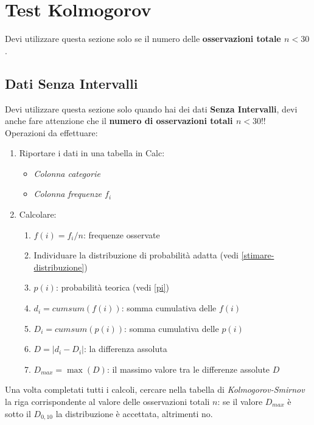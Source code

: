\section{Test Kolmogorov}

Devi utilizzare questa sezione solo se il numero delle \textbf{osservazioni
    totale $n < 30$}.

\subsection{Dati Senza Intervalli}

Devi utilizzare questa sezione solo quando hai dei dati \textbf{Senza
    Intervalli}, devi anche fare attenzione che il \textbf{numero di
    osservazioni totali $n < 30$}!!\\

Operazioni da effettuare:

\begin{enumerate}
    \item Riportare i dati in una tabella in Calc:
          \begin{itemize}
              \item \textit{Colonna categorie}
              \item \textit{Colonna frequenze $f_i$}
          \end{itemize}
    \item Calcolare:
          \begin{enumerate}
              \item $f(i) = f_i / n$: frequenze osservate
              \item Individuare la distribuzione di probabilità adatta (vedi
                    \ref{stimare-distribuzione})
              \item $p(i)$: probabilità teorica (vedi \ref{pi})
              \item $d_i = cumsum(f(i))$: somma cumulativa delle $f(i)$
              \item $D_i = cumsum(p(i))$: somma cumulativa delle $p(i)$
              \item $D = |d_i - D_i|$: la differenza assoluta
              \item $D_{max} = \max(D)$: il massimo valore tra le differenze
                    assolute $D$
          \end{enumerate}
\end{enumerate}

Una volta completati tutti i calcoli, cercare nella tabella di
\textit{Kolmogorov-Smirnov} la riga corrispondente al valore delle osservazioni
totali $n$: se il valore $D_{max}$ è sotto il $D_{0,10}$ la distribuzione è
accettata, altrimenti no.

